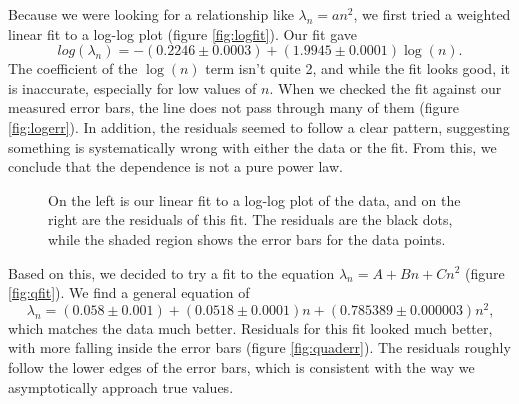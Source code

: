 \documentclass[12pt,twoside]{reedthesis}
\newcommand{\eqn}[1]{\begin{equation}#1\end{equation}}
\begin{document}
Because we were looking for a relationship like $\lambda_n = a n^2$, we first tried a weighted linear fit to a log-log plot (figure \ref{fig:logfit}). Our fit gave
\eqn{
log(\lambda_n) = -(0.2246 \pm 0.0003) + (1.9945 \pm 0.0001) \log(n)\mbox{.}
\label{eq:logfit}
} 
The coefficient of the $\log(n)$ term isn't quite 2, and while the fit looks good, it is inaccurate, especially for low values of $n$. When we checked the fit against our measured error bars, the line does not pass through many of them (figure \ref{fig:logerr}). In addition, the residuals seemed to follow a clear pattern, suggesting something is systematically wrong with either the data or the fit. From this, we conclude that the dependence is not a pure power law.
\begin{figure}[h]
\centering
{}
\caption[Log-log fit and residuals]{On the left is our linear fit to a log-log plot of the data, and on the right are the residuals of this fit. The residuals are the black dots, while the shaded region shows the error bars for the data points.}
\label{fig:loglog}
\end{figure}

Based on this, we decided to try a fit to the equation $\lambda_n = A + B n + C n^2$ (figure \ref{fig:qfit}). We find a general equation of 
\eqn{
\lambda_n = (0.058 \pm 0.001) + (0.0518 \pm 0.0001) n + ( 0.785389 \pm 0.000003) n^2\mbox{,}
}
which matches the data much better. Residuals for this fit looked much better, with more falling inside the error bars (figure \ref{fig:quaderr}). The residuals roughly follow the lower edges of the error bars, which is consistent with the way we asymptotically approach true values.
\end{document}
